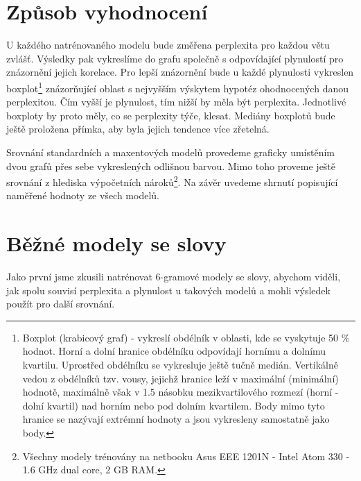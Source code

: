 \documentclass[12pt,a4paper]{report}
\begin{document}
\section{Způsob vyhodnocení}
U každého natrénovaného modelu bude změřena perplexita pro každou větu zvlášť. Výsledky pak vykreslíme do grafu společně s odpovídající plynulostí pro znázornění jejich korelace. Pro lepší znázornění bude u každé plynulosti vykreslen boxplot\footnote{Boxplot (krabicový graf) - vykreslí obdélník v oblasti, kde se vyskytuje 50 \% hodnot. Horní a dolní hranice obdélníku odpovídají hornímu a dolnímu kvartilu. Uprostřed obdélníku se vykresluje ještě tučně medián. Vertikálně vedou z obdélníků tzv. vousy, jejichž hranice leží v maximální (minimální) hodnotě, maximálně však v 1.5 násobku mezikvartilového rozmezí (horní - dolní kvartil) nad horním nebo pod dolním kvartilem. Body mimo tyto hranice se nazývají extrémní hodnoty a jsou vykresleny samostatně jako body.} znázorňující oblast s nejvyšším výskytem hypotéz ohodnocených danou perplexitou. Čím vyšší je plynulost, tím nižší by měla být perplexita. Jednotlivé boxploty by proto měly, co se perplexity týče, klesat. Mediány boxplotů bude ještě proložena přímka, aby byla jejich tendence více zřetelná.

Srovnání standardních a maxentových modelů provedeme graficky umístěním dvou grafů přes sebe vykreslených odlišnou barvou. Mimo toho proveme ještě srovnání z hlediska výpočetních nároků\footnote{Všechny modely trénovány na netbooku Asus EEE 1201N - Intel Atom 330 - 1.6 GHz dual core, 2 GB RAM.}. Na závěr uvedeme shrnutí popisující naměřené hodnoty ze všech modelů.

\section{Běžné modely se slovy}
Jako první jsme zkusili natrénovat 6-gramové modely se slovy, abychom viděli, jak spolu souvisí perplexita a plynulost u takových modelů a mohli výsledek použít pro další srovnání.
\end{document}
